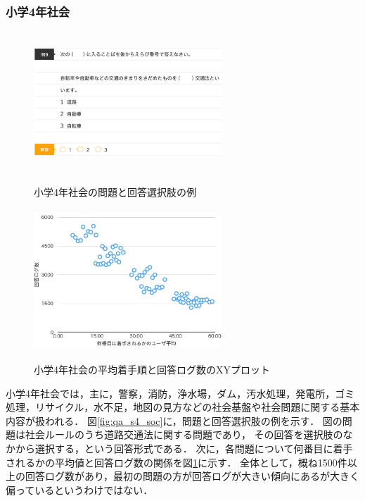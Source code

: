 \subsubsection{小学4年社会}
\begin{figure}[ht]
\begin{center}
	\includegraphics[width=200pt, height=150pt]{./img/qa_s4_soc.png}
	\caption{小学4年社会の問題と回答選択肢の例}
	\label{fig:qa_s4_soc}
\endminipage\hfill
{}
	\includegraphics[width=200pt, height=150pt]{./img/stats_s4_soc.pdf}
	\caption{小学4年社会の平均着手順と回答ログ数のXYプロット}
	\label{fig:stats_s4_soc}
\endminipage\hfill
\end{center}
\end{figure}
小学4年社会では，主に，警察，消防，浄水場，ダム，汚水処理，発電所，ゴミ処理，リサイクル，水不足，地図の見方などの社会基盤や社会問題に関する基本内容が扱われる．
図\ref{fig:qa_s4_soc}に，問題と回答選択肢の例を示す．
図の問題は社会ルールのうち道路交通法に関する問題であり，
その回答を選択肢のなかから選択する，という回答形式である．
次に，各問題について何番目に着手されるかの平均値と回答ログ数の関係を図\ref{fig:stats_s4_soc}に示す．
全体として，概ね1500件以上の回答ログ数があり，最初の問題の方が回答ログが大きい傾向にあるが大きく偏っているというわけではない．



